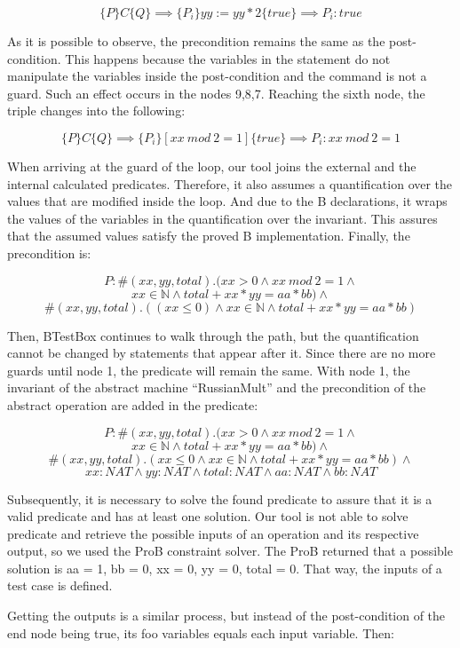\documentclass[runningheads]{llncs}
\begin{document}
$$\{P\} C \{Q\} \implies \{P_i\} yy := yy * 2\{true\} \implies P_i: true$$

As it is possible to observe, the precondition remains the same as the post-condition. This happens because the variables in the statement do not manipulate the variables inside the post-condition and the command is not a guard. Such an effect occurs in the nodes 9,8,7. Reaching the sixth node, the triple changes into the following:

$$\{P\} C \{Q\} \implies \{P_i\} [xx\ mod\ 2=1]\{true\} \implies P_i: xx\ mod\ 2 = 1$$

When arriving at the guard of the loop, our tool joins the external and the internal calculated predicates. Therefore, it also assumes a quantification over the values that are modified inside the loop. And due to the B declarations, it wraps the values of the variables in the quantification over the invariant. This assures that the assumed values satisfy the proved B implementation. Finally, the precondition is:

$$P: \#(xx, yy, total).(xx > 0 \wedge xx\ mod\ 2 = 1 \wedge$$
$$ xx \in \mathbb{N} \wedge total + xx * yy = aa * bb) \wedge$$
$$\#(xx, yy, total).((xx \leq 0) \wedge xx \in \mathbb{N} \wedge total + xx * yy = aa * bb)$$

Then, BTestBox continues to walk through the path, but the quantification cannot be changed by statements that appear after it. Since there are no more guards until node 1, the predicate will remain the same. With node 1, the invariant of the abstract machine ``RussianMult'' and the precondition of the abstract operation are added in the predicate:

$$P: \#(xx, yy, total).(xx > 0 \wedge xx\ mod\ 2 = 1 \wedge$$
$$ xx \in \mathbb{N} \wedge total + xx * yy = aa * bb) \wedge$$
$$\#(xx, yy, total).(xx \leq 0 \wedge xx \in \mathbb{N} \wedge total + xx * yy = aa * bb) \wedge$$
$$xx : NAT \wedge yy : NAT \wedge total : NAT \wedge aa : NAT \wedge bb : NAT$$

Subsequently, it is necessary to solve the found predicate to assure that it is a valid predicate and has at least one solution. Our tool is not able to solve predicate and retrieve the possible inputs of an operation and its respective output, so we used the ProB constraint solver. The ProB returned that a possible solution is aa = 1, bb = 0, xx = 0, yy = 0, total = 0. That way, the inputs of a test case is defined.

Getting the outputs is a similar process, but instead of the post-condition of the end node being true, its foo variables equals each input variable. Then:
\end{document}
